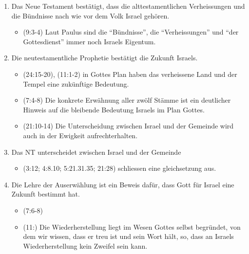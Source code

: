 \documentclass[fontsize=14pt]{../../inc/mybib}
\begin{document}
\begin{enumerate}
\begin{itemize}
    \end{itemize}
    \item Das Neue Testament bestätigt, dass die alttestamentlichen Verheissungen und die Bündnisse nach wie vor dem Volk Israel gehören.
    \begin{itemize}
        \item {}(9:3-4) Laut Paulus sind die \enquote{Bündnisse}, die \enquote{Verheissungen} und \enquote{der Gottesdienst} immer noch Israels Eigentum.
    \end{itemize}
    \item Die neutestamentliche Prophetie bestätigt die Zukunft Israels.
    \begin{itemize}
        \item {}(24:15-20), (11:1-2) in Gottes Plan haben das verheissene Land und der Tempel eine zukünftige Bedeutung.
        \item {}(7:4-8) Die konkrete Erwähnung aller zwölf Stämme ist ein deutlicher Hinweis auf die bleibende Bedeutung Israels im Plan Gottes.
        \item {}(21:10-14) Die Unterscheidung zwischen Israel und der Gemeinde wird auch in der Ewigkeit aufrechterhalten.
    \end{itemize}
    \item Das NT unterscheidet zwischen Israel und der Gemeinde
    \begin{itemize}
        \item {}(3:12; 4:8.10; 5:21.31.35; 21:28) schliessen eine gleichsetzung aus.
    \end{itemize}
    \item Die Lehre der Auserwählung ist ein Beweis dafür, dass Gott für Israel eine Zukunft bestimmt hat.
    \begin{itemize}
        \item {}(7:6-8)
        \item {}(11:) Die Wiederherstellung liegt im Wesen Gottes selbst begründet, von dem wir wissen, dass er treu ist und sein Wort hält, so, dass an Israels Wiederherstellung kein Zweifel sein kann.
    \end{itemize}    
\end{enumerate}
\end{document}
